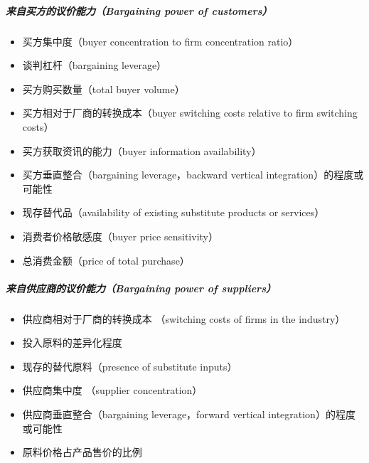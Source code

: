 \documentclass[letterpaper,10pt,english]{sphinxmanual}
\begin{document}
\subparagraph{来自买方的议价能力（Bargaining power of customers）}
\label{\detokenize{chapter_knowledge/BRD:bargaining-power-of-customers}}\begin{itemize}
\item {} 
买方集中度（buyer concentration to firm concentration ratio）

\item {} 
谈判杠杆（bargaining leverage）

\item {} 
买方购买数量（total buyer volume）

\item {} 
买方相对于厂商的转换成本（buyer switching costs relative to firm
switching costs）

\item {} 
买方获取资讯的能力（buyer information availability）

\item {} 
买方垂直整合（bargaining leverage，backward vertical
integration）的程度或可能性

\item {} 
现存替代品（availability of existing substitute products or
services）

\item {} 
消费者价格敏感度（buyer price sensitivity）

\item {} 
总消费金额（price of total purchase）

\end{itemize}


\subparagraph{来自供应商的议价能力（Bargaining power of suppliers）}
\label{\detokenize{chapter_knowledge/BRD:bargaining-power-of-suppliers}}\begin{itemize}
\item {} 
供应商相对于厂商的转换成本 （switching costs of firms in the
industry）

\item {} 
投入原料的差异化程度

\item {} 
现存的替代原料（presence of substitute inputs）

\item {} 
供应商集中度 （supplier concentration）

\item {} 
供应商垂直整合（bargaining leverage，forward vertical
integration）的程度或可能性

\item {} 
原料价格占产品售价的比例

\end{itemize}
\end{document}
